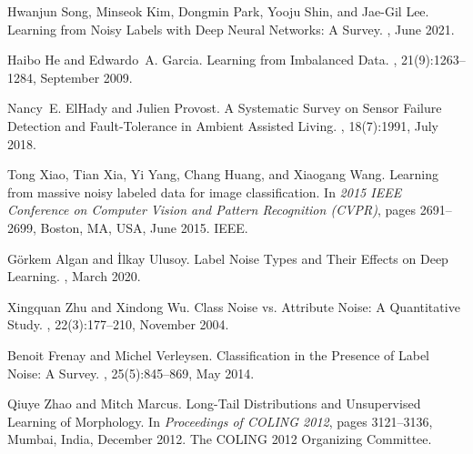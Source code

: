\documentclass{article}
\begin{document}
\begin{thebibliography}{10}

  Hwanjun Song, Minseok Kim, Dongmin Park, Yooju Shin, and Jae-Gil Lee.
  \newblock Learning from {{Noisy Labels}} with {{Deep Neural Networks}}: A
    {{Survey}}.
  , June 2021.
  
  Haibo He and Edwardo~A. Garcia.
  \newblock Learning from {{Imbalanced Data}}.
  ,
    21(9):1263--1284, September 2009.
  
  Nancy~E. ElHady and Julien Provost.
  \newblock A {{Systematic Survey}} on {{Sensor Failure Detection}} and
    {{Fault}}-{{Tolerance}} in {{Ambient Assisted Living}}.
  , 18(7):1991, July 2018.
  
  {Tong Xiao}, {Tian Xia}, {Yi Yang}, {Chang Huang}, and {Xiaogang Wang}.
  \newblock Learning from massive noisy labeled data for image classification.
  \newblock In {\em 2015 {{IEEE Conference}} on {{Computer Vision}} and {{Pattern
    Recognition}} ({{CVPR}})}, pages 2691--2699, {Boston, MA, USA}, June 2015.
    {IEEE}.
  
  G{\"o}rkem Algan and {\.I}lkay Ulusoy.
  \newblock Label {{Noise Types}} and {{Their Effects}} on {{Deep Learning}}.
  , March 2020.
  
  Xingquan Zhu and Xindong Wu.
  \newblock Class {{Noise}} vs. {{Attribute Noise}}: A {{Quantitative Study}}.
  , 22(3):177--210, November 2004.
  
  Benoit Frenay and Michel Verleysen.
  \newblock Classification in the {{Presence}} of {{Label Noise}}: A {{Survey}}.
  ,
    25(5):845--869, May 2014.
  
  Qiuye Zhao and Mitch Marcus.
  \newblock Long-{{Tail Distributions}} and {{Unsupervised Learning}} of
    {{Morphology}}.
  \newblock In {\em Proceedings of {{COLING}} 2012}, pages 3121--3136, {Mumbai,
    India}, December 2012. {The COLING 2012 Organizing Committee}.
  

\end{thebibliography}
\end{document}
